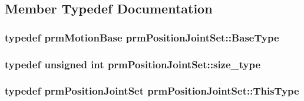 \subsection{Member Typedef Documentation}
\hypertarget{classprm_position_joint_set_a6e9b539600bf96ea6bad0516f577e7c2}{
\subsubsection[{Base\-Type}]{\setlength{\rightskip}{0pt plus 5cm}typedef {\bf prm\-Motion\-Base} {\bf prm\-Position\-Joint\-Set\-::\-Base\-Type}}}\label{classprm_position_joint_set_a6e9b539600bf96ea6bad0516f577e7c2}
\hypertarget{classprm_position_joint_set_a66e5a37bee0bb819b63270879d3ab08f}{
\subsubsection[{size\-\_\-type}]{\setlength{\rightskip}{0pt plus 5cm}typedef unsigned int {\bf prm\-Position\-Joint\-Set\-::size\-\_\-type}}}\label{classprm_position_joint_set_a66e5a37bee0bb819b63270879d3ab08f}
\hypertarget{classprm_position_joint_set_a8017067d40939015fc62a7b9e7fc70e1}{
\subsubsection[{This\-Type}]{\setlength{\rightskip}{0pt plus 5cm}typedef {\bf prm\-Position\-Joint\-Set} {\bf prm\-Position\-Joint\-Set\-::\-This\-Type}}}\label{classprm_position_joint_set_a8017067d40939015fc62a7b9e7fc70e1}


